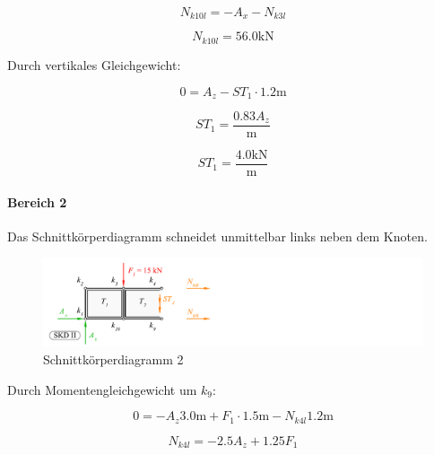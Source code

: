 \documentclass[
  12pt,
  letterpaper,
  DIV=11,
  egregdoesnotlikesansseriftitles]{scrartcl}
\let\oldparagraph\paragraph
\renewcommand{\paragraph}[1]{\oldparagraph{#1}\mbox{}}
\begin{document}
\begin{equation}N_{k10l} = - A_{x} - N_{k3l}\end{equation}

\begin{equation}N_{k10l} = 56.0 \text{k} \text{N}\end{equation}

Durch vertikales Gleichgewicht:

\begin{equation}0 = A_{z} - ST_{1} \cdot 1.2 \text{m}\end{equation}

\begin{equation}ST_{1} = \frac{0.83 A_{z}}{\text{m}}\end{equation}

\begin{equation}ST_{1} = \frac{4.0 \text{k} \text{N}}{\text{m}}\end{equation}

\hypertarget{bereich-2}{%
\paragraph{Bereich 2}\label{bereich-2}}

Das Schnittkörperdiagramm schneidet unmittelbar links neben dem Knoten.

\begin{figure}[H]

{\centering \includegraphics{BSI_HS23_Testat_03_files/mediabag/../images/Testat_03_HS23_SKD3.pdf}

}

\caption{\label{fig-skd2}Schnittkörperdiagramm 2}

\end{figure}

Durch Momentengleichgewicht um \(k_{9}\):

\begin{equation}0 = - A_{z} 3.0 \text{m} + F_{1} \cdot 1.5 \text{m} - N_{k4l} 1.2 \text{m}\end{equation}

\begin{equation}N_{k4l} = - 2.5 A_{z} + 1.25 F_{1}\end{equation}
\end{document}
